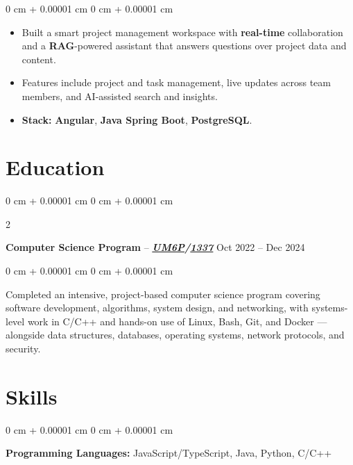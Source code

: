 \documentclass[7pt, letterpaper]{extarticle}
\newenvironment{highlights}{
    \begin{itemize}[
        topsep=0.05 cm,
        parsep=0.05 cm,
        partopsep=0pt,
        itemsep=0pt,
        leftmargin=0.6 cm
    ]
}{
    \end{itemize}
} %
\newenvironment{onecolentry}{
    \begin{adjustwidth}{
        0 cm + 0.00001 cm
    }{
        0 cm + 0.00001 cm
    }
}{
    \end{adjustwidth}
} %
\newenvironment{twocolentry}[2][]{
    \onecolentry
    \def\secondColumn{#2}
    \setcolumnwidth{\fill, 4.5 cm}
    \begin{paracol}{2}
}{
    \switchcolumn \raggedleft \secondColumn
    \end{paracol}
    \endonecolentry
} %
\let\hrefWithoutArrow\href
\begin{document}
        \begin{onecolentry}
            \begin{highlights}
                \item Built a smart project management workspace with \textbf{real-time} collaboration and a \textbf{RAG}-powered assistant that answers questions over project data and content.
                \item Features include project and task management, live updates across team members, and AI-assisted search and insights.
                \item \textbf{Stack:} \textbf{Angular}, \textbf{Java Spring Boot}, \textbf{PostgreSQL}.
            \end{highlights}
        \end{onecolentry}
        \vspace{0.20 cm}

    \section{Education}
        \begin{twocolentry}{
            Oct 2022 – Dec 2024
        }
        \textbf{Computer Science Program} -- \textbf{\textit{\hrefWithoutArrow{https://um6p.ma/}{UM6P}/\hrefWithoutArrow{https://1337.ma/en/}{1337}}} \end{twocolentry}
        \vspace{0.10 cm}

        \begin{onecolentry}
            \setlength{\leftskip}{0.3 cm}
            Completed an intensive, project-based computer science program covering software development, algorithms, system design, and networking, with systems-level work in C/C++ and hands-on use of Linux, Bash, Git, and Docker — alongside data structures, databases, operating systems, network protocols, and security.
        \end{onecolentry}

    \vspace{0.20 cm}
    \section{Skills}

        \begin{onecolentry}
            \textbf{Programming Languages:} JavaScript/TypeScript, Java, Python, C/C++
        \end{onecolentry}
        \vspace{0.10 cm}
        
\end{document}
